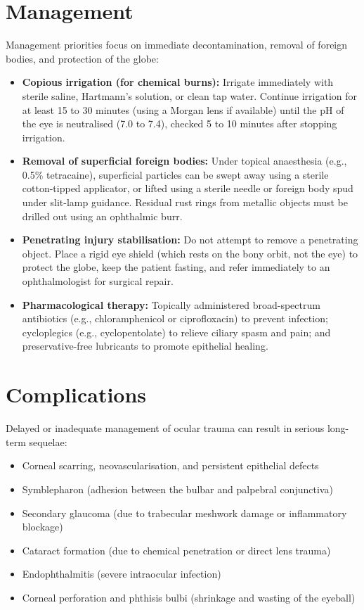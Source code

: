 \section*{Management}
Management priorities focus on immediate decontamination, removal of foreign bodies, and protection of the globe:
\begin{itemize}
    \item \textbf{Copious irrigation (for chemical burns):} Irrigate immediately with sterile saline, Hartmann's solution, or clean tap water. Continue irrigation for at least 15 to 30 minutes (using a Morgan lens if available) until the pH of the eye is neutralised (7.0 to 7.4), checked 5 to 10 minutes after stopping irrigation.
    \item \textbf{Removal of superficial foreign bodies:} Under topical anaesthesia (e.g., 0.5\% tetracaine), superficial particles can be swept away using a sterile cotton-tipped applicator, or lifted using a sterile needle or foreign body spud under slit-lamp guidance. Residual rust rings from metallic objects must be drilled out using an ophthalmic burr.
    \item \textbf{Penetrating injury stabilisation:} Do not attempt to remove a penetrating object. Place a rigid eye shield (which rests on the bony orbit, not the eye) to protect the globe, keep the patient fasting, and refer immediately to an ophthalmologist for surgical repair.
    \item \textbf{Pharmacological therapy:} Topically administered broad-spectrum antibiotics (e.g., chloramphenicol or ciprofloxacin) to prevent infection; cycloplegics (e.g., cyclopentolate) to relieve ciliary spasm and pain; and preservative-free lubricants to promote epithelial healing.
\end{itemize}

\section*{Complications}
Delayed or inadequate management of ocular trauma can result in serious long-term sequelae:
\begin{itemize}
    \item Corneal scarring, neovascularisation, and persistent epithelial defects
    \item Symblepharon (adhesion between the bulbar and palpebral conjunctiva)
    \item Secondary glaucoma (due to trabecular meshwork damage or inflammatory blockage)
    \item Cataract formation (due to chemical penetration or direct lens trauma)
    \item Endophthalmitis (severe intraocular infection)
    \item Corneal perforation and phthisis bulbi (shrinkage and wasting of the eyeball)
\end{itemize}


